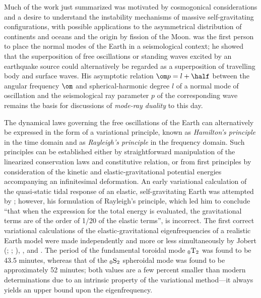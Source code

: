Much of the work just summarized was motivated by cosmogonical
considerations and a desire to understand the instability
mechanisms of massive self-gravitating
configurations, with possible applications to the asymmetrical
distribution of continents and oceans and the origin by fission of
the Moon.  \textcite{jeans23} was the first person to place the normal modes
of the Earth in a seismological context; he showed that the superposition
of free oscillations
or standing waves excited by an earthquake source could alternatively
be regarded as a superposition of travelling body and surface waves.
His asymptotic relation $\om p=l+\half$ between the angular frequency $\om$
and spherical-harmonic degree $l$ of a normal mode of oscillation and
the seismological ray parameter $p$ of the corresponding wave
remains the basis for discussions of {\em mode-ray duality\/} to this day.
%
%

The dynamical laws governing the free oscillations of the Earth can
alternatively be expressed in the form of a variational principle,
known as {\em Hamilton's principle\/}
%
in the time domain and as {\em Rayleigh's principle\/}
%
in the frequency
domain.  Such principles can be established either by straightforward
manipulation of the linearized conservation laws and constitutive relation, or
from first principles by consideration of the kinetic and elastic-gravitational
potential energies accompanying an infinitesimal deformation.  An early
variational calculation of the quasi-static tidal response of an elastic,
self-gravitating Earth was attempted by \textcite{stoneley26b}; however, his
formulation of Rayleigh's principle, which led him to conclude ``that when the
expression for the total energy is evaluated, the gravitational terms are of
the order of 1/20 of the elastic terms'', is incorrect.  The first correct
variational calculations of the elastic-gravitational eigenfrequencies
of a realistic Earth model were made independently and more
or less simultaneously by Jobert (\citeyear{jobert56}; \citeyear{jobert57};
\citeyear{jobert61}),
\textcite{pekeris&jarosch58}, and \textcite{takeuchi59}.  The period of the
fundamental toroidal mode ${}_0{\rm T}_2$ was found to be 43.5 minutes,
whereas that of the ${}_0{\rm S}_2$ spheroidal mode was found to be
approximately 52 minutes; both values are a few percent smaller than modern
determinations due to an intrinsic property of the variational method---it
always yields an upper bound upon the eigenfrequency.

